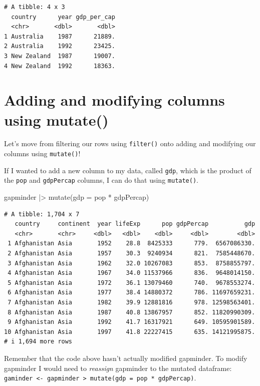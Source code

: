 \documentclass[
  letterpaper,
  DIV=11,
  numbers=noendperiod]{scrreprt}
\newenvironment{Shaded}{\begin{snugshade}}{\end{snugshade}}
\newcommand{\AttributeTok}[1]{\textcolor[rgb]{0.40,0.45,0.13}{#1}}
\newcommand{\FunctionTok}[1]{\textcolor[rgb]{0.28,0.35,0.67}{#1}}
\newcommand{\NormalTok}[1]{\textcolor[rgb]{0.00,0.23,0.31}{#1}}
\newcommand{\SpecialCharTok}[1]{\textcolor[rgb]{0.37,0.37,0.37}{#1}}
\begin{document}
\begin{verbatim}
# A tibble: 4 x 3
  country      year gdp_per_cap
  <chr>       <dbl>       <dbl>
1 Australia    1987      21889.
2 Australia    1992      23425.
3 New Zealand  1987      19007.
4 New Zealand  1992      18363.
\end{verbatim}

\section{Adding and modifying columns using
mutate()}\label{adding-and-modifying-columns-using-mutate}

Let's move from filtering our rows using \texttt{filter()} onto adding
and modifying our columns using \texttt{mutate()}!

If I wanted to add a new column to my data, called \texttt{gdp}, which
is the product of the \texttt{pop} and \texttt{gdpPercap} columns, I can
do that using \texttt{mutate()}.

\begin{Shaded}
\begin{Highlighting}[]
\NormalTok{gapminder }\SpecialCharTok{|\textgreater{}} \FunctionTok{mutate}\NormalTok{(}\AttributeTok{gdp =}\NormalTok{ pop }\SpecialCharTok{*}\NormalTok{ gdpPercap) }
\end{Highlighting}
\end{Shaded}

\begin{verbatim}
# A tibble: 1,704 x 7
   country     continent  year lifeExp      pop gdpPercap          gdp
   <chr>       <chr>     <dbl>   <dbl>    <dbl>     <dbl>        <dbl>
 1 Afghanistan Asia       1952    28.8  8425333      779.  6567086330.
 2 Afghanistan Asia       1957    30.3  9240934      821.  7585448670.
 3 Afghanistan Asia       1962    32.0 10267083      853.  8758855797.
 4 Afghanistan Asia       1967    34.0 11537966      836.  9648014150.
 5 Afghanistan Asia       1972    36.1 13079460      740.  9678553274.
 6 Afghanistan Asia       1977    38.4 14880372      786. 11697659231.
 7 Afghanistan Asia       1982    39.9 12881816      978. 12598563401.
 8 Afghanistan Asia       1987    40.8 13867957      852. 11820990309.
 9 Afghanistan Asia       1992    41.7 16317921      649. 10595901589.
10 Afghanistan Asia       1997    41.8 22227415      635. 14121995875.
# i 1,694 more rows
\end{verbatim}

Remember that the code above hasn't actually modified gapminder. To
modify gapminder I would need to \emph{reassign} gapminder to the
mutated dataframe:
\texttt{gaminder\ \textless{}-\ gapminder\ \textbar{}\textgreater{}\ mutate(gdp\ =\ pop\ *\ gdpPercap)}.
\end{document}
